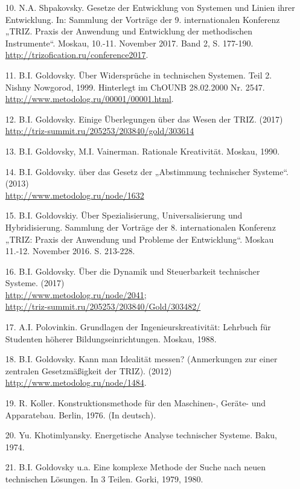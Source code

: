 \documentclass[11pt,a4paper]{article}
\begin{document}
\begin{itemize}
\item[10.] N.A. Shpakovsky. Gesetze der Entwicklung von Systemen und Linien
  ihrer Entwicklung. In: Sammlung der Vorträge der 9. internationalen
  Konferenz „TRIZ. Praxis der Anwendung und Entwicklung der methodischen
  Instrumente“.  Moskau, 10.-11. November 2017. Band 2, S. 177-190.
  \url{http://trizofication.ru/conference2017}.
\item[11.] B.I. Goldovsky. Über Widersprüche in technischen Systemen. Teil 2.
  Nishny Nowgorod, 1999. Hinterlegt im ChOUNB 28.02.2000 Nr. 2547.\\
  \url{http://www.metodolog.ru/00001/00001.html}.
\item[12.] B.I. Goldovsky. Einige Überlegungen über das Wesen der
  TRIZ. (2017)\\ \url{http://triz-summit.ru/205253/203840/gold/303614}
\item[13.] B.I. Goldovsky, M.I. Vainerman. Rationale Kreativität. Moskau,
  1990.
\item[14.] B.I. Goldovsky. über das Gesetz der „Abstimmung technischer
  Systeme“. (2013)\\ \url{http://www.metodolog.ru/node/1632}
\item[15.] B.I. Goldovskiy. Über Spezialisierung, Universalisierung und
  Hybridisierung. Sammlung der Vorträge der 8. internationalen Konferenz
  „TRIZ: Praxis der Anwendung und Probleme der Entwicklung“. Moskau
  11.-12. November 2016. S. 213-228.
\item[16.] B.I. Goldovsky. Über die Dynamik und Steuerbarkeit technischer
  Systeme. (2017)\\ \url{http://www.metodolog.ru/node/2041};\\
  \url{http://triz-summit.ru/205253/203840/Gold/303482/}
\item[17.] A.I. Polovinkin. Grundlagen der Ingenieurskreativität: Lehrbuch für
  Studenten höherer Bildungseinrichtungen. Moskau, 1988.
\item[18.] B.I. Goldovsky. Kann man Idealität messen? (Anmerkungen zur einer
  zentralen Gesetzmäßigkeit der TRIZ). (2012)
  \url{http://www.metodolog.ru/node/1484}.
\item[19.] R. Koller. Konstruktionsmethode für den Maschinen-, Geräte- und
  Apparatebau. Berlin, 1976. (In deutsch).  
\item[20.] Yu. Khotimlyansky. Energetische Analyse technischer Systeme. Baku,
  1974.
\item[21.] B.I. Goldovsky u.a. Eine komplexe Methode der Suche nach neuen
  technischen Lösungen. In 3 Teilen. Gorki, 1979, 1980.

\end{itemize}
\end{document}
